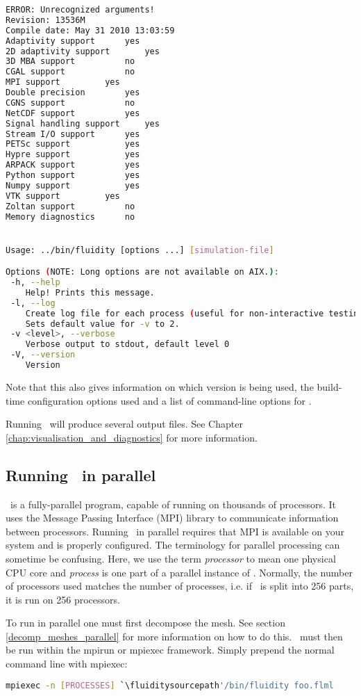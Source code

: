 \begin{lstlisting}[language=Bash]
ERROR: Unrecognized arguments!
Revision: 13536M
Compile date: May 31 2010 13:03:59
Adaptivity support		yes
2D adaptivity support		yes
3D MBA support			no
CGAL support			no
MPI support			yes
Double precision		yes
CGNS support			no
NetCDF support			yes
Signal handling support		yes
Stream I/O support		yes
PETSc support			yes
Hypre support			yes
ARPACK support			yes
Python support			yes
Numpy support			yes
VTK support			yes
Zoltan support			no
Memory diagnostics		no


Usage: ../bin/fluidity [options ...] [simulation-file]

Options (NOTE: Long options are not available on AIX.):
 -h, --help
    Help! Prints this message.
 -l, --log
    Create log file for each process (useful for non-interactive testing).
    Sets default value for -v to 2.
 -v <level>, --verbose
    Verbose output to stdout, default level 0
 -V, --version
    Version
\end{lstlisting}

Note that this also gives information on which version is being used, the build-time 
configuration options used and a list of command-line options for \fluidity. 

Running \fluidity\ will produce several output files. See Chapter \ref{chap:visualisation_and_diagnostics}
for more information.

\subsection{Running \fluidity\ in parallel}
\label{sect:running_fluidity_in_parallel}

\fluidity\ is a fully-parallel program, capable of running on thousands of processors. 
It uses the Message Passing Interface (MPI) library to communicate information between 
processors. Running \fluidity\ in parallel requires that MPI is available on your system
and is properly configured. The terminology for parallel processing can sometime be confusing.
Here, we use the term \emph{processor} to mean one physical CPU core and \emph{process} is one part
of a parallel instance of \fluidity. Normally, the number of processors used matches
the number of processes, i.e. if \fluidity\ is split into 256 parts, it is run on 256 processors.

To run in parallel one must first decompose the mesh. See section \ref{decomp_meshes_parallel}
for more information on how to do this. \fluidity\ 
must then be run within the mpirun or mpiexec framework. Simply prepend the normal command line with mpiexec:
\begin{lstlisting}[language=bash]
mpiexec -n [PROCESSES] `\fluiditysourcepath'/bin/fluidity foo.flml
\end{lstlisting}

